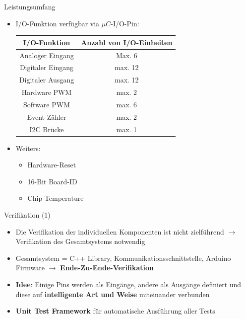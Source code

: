 \documentclass{beamer}
\begin{document}
\begin{frame}{Leistungsumfang}
\begin{itemize}
 \item I/O-Funktion verf\"ugbar via $\mu{}C$-I/O-Pin:
 \begin{table}[htbp]
  \begin{tabular}{|c|c|}
  \hline 
  \textbf{I/O-Funktion} & \textbf{Anzahl von I/O-Einheiten} \\ 
  \hline \hline 
  Analoger Eingang & Max. 6 \\ 
  \hline 
  Digitaler Eingang & max. 12  \\ 
  \hline
  Digitaler Ausgang & max. 12 \\ 
  \hline
  Hardware PWM & max. 2 \\ 
  \hline
  Software PWM & max. 6 \\ 
  \hline
  Event Z\"ahler & max. 2 \\
  \hline
  I2C Br\"ucke & max. 1 \\
  \hline
  \end{tabular}
 \end{table}
 \item Weiters:
 \begin{itemize}
  \item Hardware-Reset
  \item 16-Bit Board-ID
  \item Chip-Temperature
 \end{itemize}
\end{itemize}
\end{frame}
\begin{frame}{Verifikation (1)}
\begin{itemize}
 \item Die Verifikation der individuellen Komponenten ist nicht zielf\"uhrend $\rightarrow$ Verifikation des Gesamtsystems notwendig
\end{itemize}
\begin{itemize}
 \item Gesamtsystem = C++ Library, Kommunikationsschnittstelle, Arduino Firmware $\rightarrow$ \textbf{Ende-Zu-Ende-Verifikation}
\end{itemize}
\begin{itemize}
 \item \textbf{Idee}: Einige Pins werden als Eing\"ange, andere als Ausg\"ange definiert und diese auf \textbf{intelligente Art und Weise} miteinander verbunden
\end{itemize}
\begin{itemize}
 \item \textbf{Unit Test Framework} f\"ur automatische Ausf\"uhrung aller Tests
\end{itemize}
\end{frame}
\end{document}
